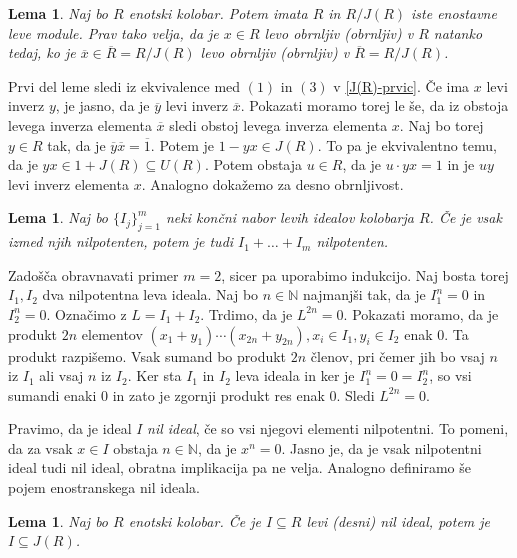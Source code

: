 \documentclass[a4paper, 12pt]{amsart}
\theoremstyle{definition} %
\theoremstyle{plain} %
\newtheorem{lema}[definicija]{Lema}
\newcommand{\N}{\mathbb N}
\begin{document}
\begin{lema}
\label{RinR/J(R)}
Naj bo $R$ enotski kolobar. Potem imata $R$ in $R/J(R)$ iste enostavne leve module. Prav tako velja, da je $x\in R$ levo obrnljiv (obrnljiv) v $R$ natanko tedaj, ko je $\overline{x} \in \overline{R} = R/J(R)$ levo obrnljiv (obrnljiv) v $\overline{R} = R/J(R)$.
\end{lema}

\proof
Prvi del leme sledi iz ekvivalence med $(1)$ in $(3)$ v \ref{J(R)-prvic}. Če ima $x$ levi inverz $y$, je jasno, da je $\overline{y}$ levi inverz $\overline{x}$. Pokazati moramo torej le še, da iz obstoja levega inverza elementa $\overline{x}$ sledi obstoj levega inverza  elementa $x$. Naj bo torej $y\in R$ tak, da je $\overline{y} \overline{x} = \overline{1}$. Potem je $1- yx \in J(R)$. To pa je ekvivalentno temu, da je $yx \in 1 + J(R) \subseteq U(R)$. Potem obstaja  $u\in R$, da je $u\cdot yx =1$ in je $uy $ levi inverz elementa $x$. Analogno dokažemo za desno obrnljivost.
\endproof

\begin{lema}
Naj bo $\{I_j\}_{j=1}^m$ neki končni nabor levih idealov kolobarja $R$. Če je vsak izmed njih nilpotenten, potem je tudi $I_1 + \dots + I_m$ nilpotenten.
\end{lema}

\proof
Zadošča obravnavati primer $m=2$, sicer pa uporabimo indukcijo. Naj bosta torej $I_1,I_2$ dva nilpotentna leva ideala. Naj bo $n\in \N$ najmanjši tak, da je $I_1^n = 0$ in $I_2^n = 0$. Označimo z $L=I_1 + I_2$. Trdimo, da je $L^{2n} = 0$. Pokazati moramo, da je produkt $2n$ elementov $(x_1 + y_1) \cdots (x_{2n} + y_{2n}), x_i \in I_1, y_i \in I_2$  enak 0. Ta produkt razpišemo. Vsak sumand bo produkt $2n$ členov, pri čemer jih bo vsaj $n$ iz $I_1$ ali vsaj $n$ iz $I_2$. Ker sta $I_1$ in $I_2$ leva ideala in ker je $I_1^n = 0 = I_2^n$, so vsi sumandi enaki 0 in zato je zgornji produkt res enak 0. Sledi $L^{2n} = 0$.
\endproof
 
Pravimo, da je ideal $I$ \emph{nil ideal}, če so vsi njegovi elementi nilpotentni. To pomeni, da za vsak $x\in I$ obstaja $n\in \N$, da je $x^n =0$. Jasno je, da je vsak nilpotentni ideal tudi nil ideal, obratna implikacija pa ne velja.
Analogno definiramo še pojem enostranskega nil ideala.

\begin{lema}
\label{nilPodJ(R)}
Naj bo $R$ enotski kolobar. Če je $I\subseteq R$ levi (desni) nil ideal, potem je $I\subseteq J(R)$.
\end{lema}
\end{document}
